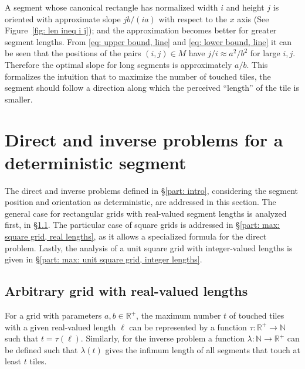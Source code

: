 \documentclass[12pt, a4paper]{article}
\newcommand{\funt}{\tau} %
\newcommand{\funl}{\lambda} %
\newcommand{\len}{\ell} %
\newcommand{\tiles}{t} %
\newcommand{\mss}{M}
\begin{document}
A segment whose canonical rectangle has normalized width $i$ and height $j$ is oriented with approximate slope $jb/(ia)$ with respect to the $x$ axis (See Figure~\ref{fig: len ineq i j}); and the approximation becomes better for greater segment lengths. From \eqref{eq: upper bound, line} and \eqref{eq: lower bound, line} it can be seen that the positions of the pairs $(i,j) \in \mss$ have $j/i \approx a^2/b^2$ for large $i, j$. Therefore the optimal slope for long segments is approximately $a/b$. This formalizes the intuition that to maximize the number of touched tiles, the segment should follow a direction along which the perceived ``length'' of the tile is smaller.


\section{Direct and inverse problems for a deterministic segment}
\label{part: max}

The direct and inverse problems defined in \S\ref{part: intro}, considering the segment position and orientation as deterministic, are addressed in this section. The general case for rectangular grids with real-valued segment lengths is analyzed first, in \S\ref{part: max: arbitrary grid, real lengths}. The particular case of square grids is addressed in \S\ref{part: max: square grid, real lengths}, as it allows a specialized formula for the direct problem. Lastly, the analysis of a unit square grid with integer-valued lengths is given in \S\ref{part: max: unit square grid, integer lengths}.


\subsection{Arbitrary grid with real-valued lengths}
\label{part: max: arbitrary grid, real lengths}

For a grid with parameters $a, b \in \mathbb R^+$, the maximum number $\tiles$ of touched tiles with a given real-valued length $\len$ can be represented by a function $\funt: \mathbb R^+ \to \mathbb N$ such that $\tiles = \funt(\len)$. Similarly, for the inverse problem a function $\funl: \mathbb N \to \mathbb R^+$ can be defined such that $\funl(\tiles)$ gives the infimum length of all segments that touch at least $\tiles$ tiles.
\end{document}
